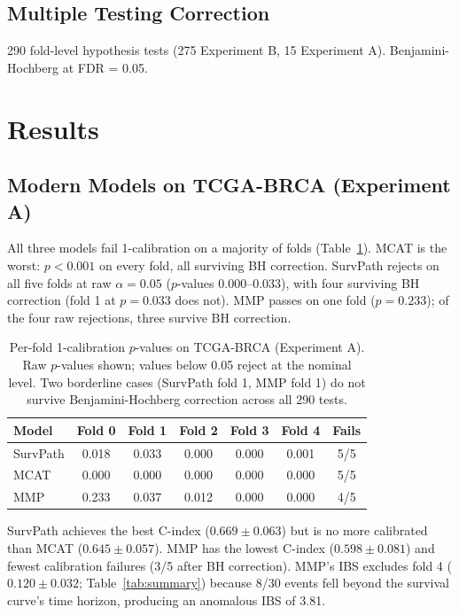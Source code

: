 \documentclass[pmlr]{jmlr}
\begin{document}
\subsection{Multiple Testing Correction}

290 fold-level hypothesis tests (275 Experiment B, 15 Experiment A). Benjamini-Hochberg at FDR = 0.05.

\section{Results}

\subsection{Modern Models on TCGA-BRCA (Experiment A)}

All three models fail 1-calibration on a majority of folds (Table~\ref{tab:perfold}). MCAT is the worst: $p < 0.001$ on every fold, all surviving BH correction. SurvPath rejects on all five folds at raw $\alpha = 0.05$ ($p$-values 0.000--0.033), with four surviving BH correction (fold 1 at $p = 0.033$ does not). MMP passes on one fold ($p = 0.233$); of the four raw rejections, three survive BH correction.

\begin{table}[t]
\centering
\caption{Per-fold 1-calibration $p$-values on TCGA-BRCA (Experiment A). Raw $p$-values shown; values below 0.05 reject at the nominal level. Two borderline cases (SurvPath fold 1, MMP fold 1) do not survive Benjamini-Hochberg correction across all 290 tests.}
\label{tab:perfold}
\begin{tabular}{lcccccc}
\toprule
Model & Fold 0 & Fold 1 & Fold 2 & Fold 3 & Fold 4 & Fails \\
\midrule
SurvPath & 0.018 & 0.033 & 0.000 & 0.000 & 0.001 & 5/5 \\
MCAT     & 0.000 & 0.000 & 0.000 & 0.000 & 0.000 & 5/5 \\
MMP      & 0.233 & 0.037 & 0.012 & 0.000 & 0.000 & 4/5 \\
\bottomrule
\end{tabular}
\end{table}

SurvPath achieves the best C-index ($0.669 \pm 0.063$) but is no more calibrated than MCAT ($0.645 \pm 0.057$). MMP has the lowest C-index ($0.598 \pm 0.081$) and fewest calibration failures (3/5 after BH correction). MMP's IBS excludes fold 4 ($0.120 \pm 0.032$; Table~\ref{tab:summary}) because 8/30 events fell beyond the survival curve's time horizon, producing an anomalous IBS of 3.81.
\end{document}
